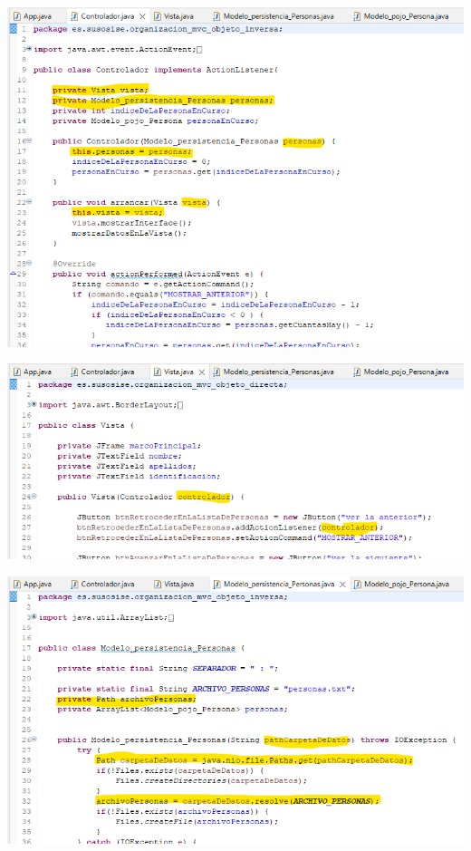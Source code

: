 \documentclass[spanish,12pt,a4paper,final,oneside]{book}
\begin{document}
\includegraphics[width=\textwidth]{MVC_inversa_Controlador} 

\includegraphics[width=\textwidth]{MVC_inversa_Vista} 

\includegraphics[width=\textwidth]{MVC_inversa_Persistencia} 


\end{document}
